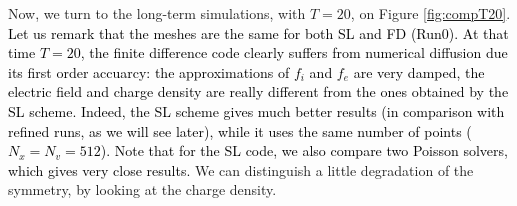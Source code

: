 \documentclass{article}
\numberwithin{equation}{section}
\begin{document}
Now, we turn to the long-term simulations, with $T=20$, on Figure \ref{fig:compT20}.  %
%
\textcolor{black}{Let us remark that the meshes are the same for both SL and FD (Run0). At that time $T=20$, 
the finite difference code clearly suffers from numerical diffusion due its first order accuarcy: 
the approximations of $f_i$ and $f_e$ are very damped, 
the electric field and charge density are really different from the ones obtained by the SL scheme. 
Indeed, the SL scheme gives much better results (in comparison with refined runs, as we will see later), 
while it uses the same number of points ($N_x=N_v=512$).  
Note that for the SL code, we also compare two Poisson solvers, which gives very close results. }
 We can distinguish a little degradation of the symmetry, by looking at the charge density.
%
\end{document}
